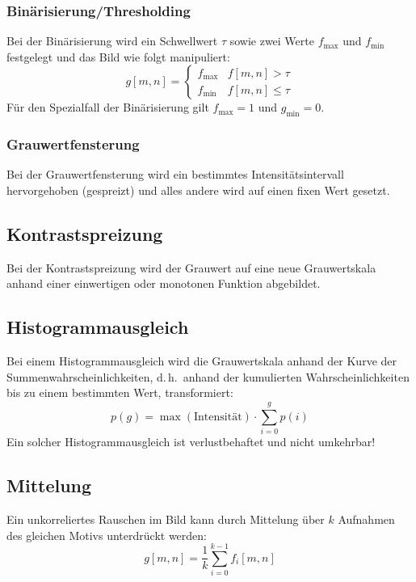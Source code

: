 \documentclass[a4paper, 11pt, accentcolor = tud3b]{tudreport}
\renewcommand{\dh}{d.\,h.~}
\begin{document}
				\subsubsection{Binärisierung/Thresholding}
					Bei der Binärisierung wird ein Schwellwert \(\tau\) sowie zwei Werte \(f_\text{max}\) und \(f_\text{min}\) festgelegt und das Bild wie folgt manipuliert:
					\begin{equation*}
						g[m, n] =
							\begin{cases}
								f_\text{max} & f[m, n] > \tau \\
								f_\text{min} & f[m, n] \leq \tau
							\end{cases}
					\end{equation*}
					Für den Spezialfall der Binärisierung gilt \( f_\text{max} = 1 \) und \( g_\text{min} = 0 \).

				\subsubsection{Grauwertfensterung}
					Bei der Grauwertfensterung wird ein bestimmtes Intensitätsintervall hervorgehoben (gespreizt) und alles andere wird auf einen fixen Wert gesetzt.
				
				\subsection{Kontrastspreizung}
					Bei der Kontrastspreizung wird der Grauwert auf eine neue Grauwertskala anhand einer einwertigen oder monotonen Funktion abgebildet.
				
				\subsection{Histogrammausgleich}
					Bei einem Histogrammausgleich wird die Grauwertskala anhand der Kurve der Summenwahrscheinlichkeiten, \dh anhand der kumulierten Wahrscheinlichkeiten bis zu einem bestimmten Wert, transformiert:
					\begin{equation*}
						p(g) = \max(\text{Intensität}) \cdot \sum_{i = 0}^{g} p(i)
					\end{equation*}
					Ein solcher Histogrammausgleich ist verlustbehaftet und nicht umkehrbar!
				
				\subsection{Mittelung}
					Ein unkorreliertes Rauschen im Bild kann durch Mittelung über \(k\) Aufnahmen des gleichen Motivs unterdrückt werden:
					\begin{equation*}
						g[m, n] = \frac{1}{k} \sum_{i = 0}^{k - 1} f_i[m, n]
					\end{equation*}
\end{document}
